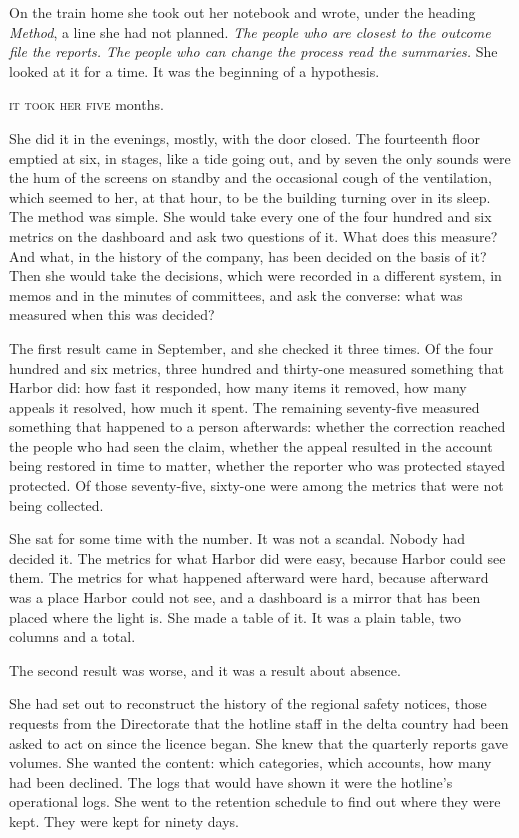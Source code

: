 On the train home she took out her notebook and wrote, under the heading \emph{Method}, a line she had not planned. \emph{The people who are closest to the outcome file the reports. The people who can change the process read the summaries.} She looked at it for a time. It was the beginning of a hypothesis.


\textsc{it took her five} months.

She did it in the evenings, mostly, with the door closed. The fourteenth floor emptied at six, in stages, like a tide going out, and by seven the only sounds were the hum of the screens on standby and the occasional cough of the ventilation, which seemed to her, at that hour, to be the building turning over in its sleep. The method was simple. She would take every one of the four hundred and six metrics on the dashboard and ask two questions of it. What does this measure? And what, in the history of the company, has been decided on the basis of it? Then she would take the decisions, which were recorded in a different system, in memos and in the minutes of committees, and ask the converse: what was measured when this was decided?

The first result came in September, and she checked it three times. Of the four hundred and six metrics, three hundred and thirty-one measured something that Harbor did: how fast it responded, how many items it removed, how many appeals it resolved, how much it spent. The remaining seventy-five measured something that happened to a person afterwards: whether the correction reached the people who had seen the claim, whether the appeal resulted in the account being restored in time to matter, whether the reporter who was protected stayed protected. Of those seventy-five, sixty-one were among the metrics that were not being collected.

She sat for some time with the number. It was not a scandal. Nobody had decided it. The metrics for what Harbor did were easy, because Harbor could see them. The metrics for what happened afterward were hard, because afterward was a place Harbor could not see, and a dashboard is a mirror that has been placed where the light is. She made a table of it. It was a plain table, two columns and a total.

The second result was worse, and it was a result about absence.

She had set out to reconstruct the history of the regional safety notices, those requests from the Directorate that the hotline staff in the delta country had been asked to act on since the licence began. She knew that the quarterly reports gave volumes. She wanted the content: which categories, which accounts, how many had been declined. The logs that would have shown it were the hotline's operational logs. She went to the retention schedule to find out where they were kept. They were kept for ninety days.

